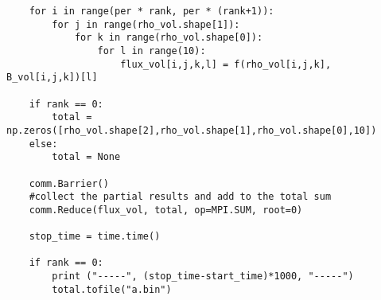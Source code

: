 \begin{lstlisting}
    for i in range(per * rank, per * (rank+1)):
        for j in range(rho_vol.shape[1]):
            for k in range(rho_vol.shape[0]):
                for l in range(10):
                    flux_vol[i,j,k,l] = f(rho_vol[i,j,k], B_vol[i,j,k])[l]

    if rank == 0:
        total = np.zeros([rho_vol.shape[2],rho_vol.shape[1],rho_vol.shape[0],10])
    else:
        total = None

    comm.Barrier()
    #collect the partial results and add to the total sum
    comm.Reduce(flux_vol, total, op=MPI.SUM, root=0)

    stop_time = time.time()

    if rank == 0:
        print ("-----", (stop_time-start_time)*1000, "-----")
        total.tofile("a.bin")

\end{lstlisting}
